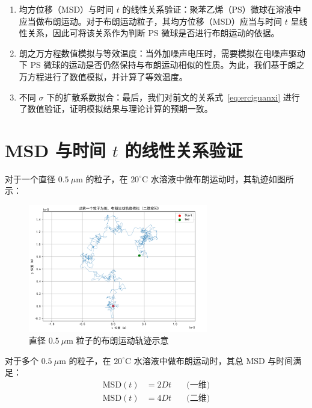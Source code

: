 \documentclass[a4paper]{report} %
\begin{document}
\begin{enumerate}
  \item 均方位移（MSD）与时间 $t$ 的线性关系验证：聚苯乙烯（PS）微球在溶液中应当做布朗运动。对于布朗运动粒子，其均方位移（MSD）应当与时间 $t$ 呈线性关系，因此可将该关系作为判断 PS 微球是否进行布朗运动的依据。

  \item 朗之万方程数值模拟与等效温度：当外加噪声电压时，需要模拟在电噪声驱动下 PS 微球的运动是否仍然保持与布朗运动相似的性质。为此，我们基于朗之万方程进行了数值模拟，并计算了等效温度。

  \item 不同 $\sigma$ 下的扩散系数拟合：最后，我们对前文的关系式~\eqref{eq:erciguanxi} 进行了数值验证，证明模拟结果与理论计算的预期一致。
\end{enumerate}
\newpage
\section{ MSD 与时间 $t$ 的线性关系验证}

对于一个直径 $0.5~\mu\text{m}$ 的粒子，在 $20^\circ$C 水溶液中做布朗运动时，其轨迹如图所示：
\begin{figure}[H]
  \centering
  \includegraphics[width=0.7\textwidth]{trajectory.png}
  \caption{直径 $0.5~\mu$m 粒子的布朗运动轨迹示意}
  \label{fig:trajectory}
\end{figure}

对于多个 $0.5~\mu\text{m}$ 的粒子，在 $20^\circ$C 水溶液中做布朗运动时，其总 MSD 与时间满足\cite{einstein1905}：
\begin{align}
  \text{MSD}(t) &= 2Dt \quad &\text{(一维)} \\
  \text{MSD}(t) &= 4Dt \quad &\text{(二维)}
\end{align}
\end{document}

